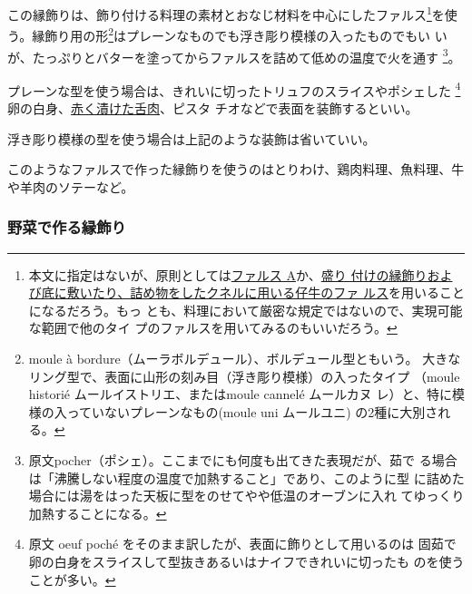 \begin{recette}
この縁飾りは、飾り付ける料理の素材とおなじ材料を中心にしたファルス\footnote{本文に指定はないが、原則としては\protect\hyperlink{farce-a}{ファルス
  A}か、\protect\hyperlink{farce-de-veau-pour-bordures}{盛り
  付けの縁飾りおよび底に敷いたり、詰め物をしたクネルに用いる仔牛のファ
  ルス}を用いることになるだろう。もっ
  とも、料理において厳密な規定ではないので、実現可能な範囲で他のタイ
  プのファルスを用いてみるのもいいだろう。}を使
う。縁飾り用の形\footnote{moule à
  bordure（ムーラボルデュール）、ボルデュール型ともいう。
  大きなリング型で、表面に山形の刻み目（浮き彫り模様）の入ったタイプ
  （moule historié ムールイストリエ、またはmoule cannelé ムールカヌ
  レ）と、特に模様の入っていないプレーンなもの(moule uni ムールユニ)
  の2種に大別される。}はプレーンなものでも浮き彫り模様の入ったものでもい
いが、たっぷりとバターを塗ってからファルスを詰めて低めの温度で火を通す
\footnote{原文pocher（ポシェ）。ここまでにも何度も出てきた表現だが、茹で
  る場合は「沸騰しない程度の温度で加熱すること」であり、このように型
  に詰めた場合には湯をはった天板に型をのせてやや低温のオーブンに入れ
  てゆっくり加熱することになる。}。

プレーンな型を使う場合は、きれいに切ったトリュフのスライスやポシェした
\footnote{原文 oeuf poché をそのまま訳したが、表面に飾りとして用いるのは
  固茹で卵の白身をスライスして型抜きあるいはナイフできれいに切ったも
  のを使うことが多い。}卵の白身、\protect\hyperlink{saumure-liquide-pour-langues}{赤く漬けた舌肉}、ピスタ
チオなどで表面を装飾するといい。

浮き彫り模様の型を使う場合は上記のような装飾は省いていい。

このようなファルスで作った縁飾りを使うのはとりわけ、鶏肉料理、魚料理、牛や羊肉のソテーなど。

\maeaki

\hypertarget{bordures-en-legumes}{%
\subsubsection{野菜で作る縁飾り}\label{bordures-en-legumes}}




\end{recette}
